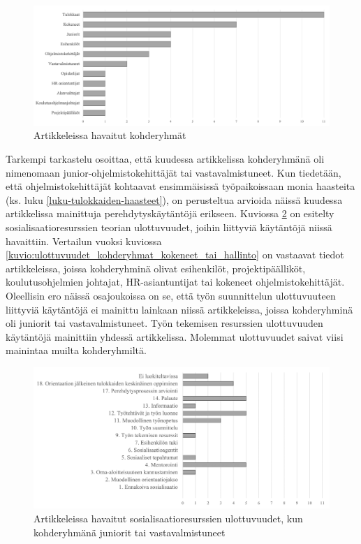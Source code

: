 \documentclass[utf8]{gradu3}
\begin{document}
\begin{figure}[h]
    \centering
    \includegraphics[width=\textwidth]{media/kohderyhmat.png}
    \caption{Artikkeleissa havaitut kohderyhmät}
    \label{kuvio:kohderyhmat}
\end{figure}

Tarkempi tarkastelu osoittaa, että kuudessa artikkelissa kohderyhmänä oli nimenomaan junior-ohjelmistokehittäjät tai vastavalmistuneet. Kun tiedetään, että ohjelmistokehittäjät kohtaavat ensimmäisissä työpaikoissaan monia haasteita (ks. luku \ref{luku-tulokkaiden-haasteet}), on perusteltua arvioida näissä kuudessa artikkelissa mainittuja perehdytyskäytäntöjä erikseen. Kuviossa \ref{kuvio:ulottuvuudet_kohderyhmat_juniorit} on esitelty sosialisaatioresurssien teorian ulottuvuudet, joihin liittyviä käytäntöjä niissä havaittiin. Vertailun vuoksi kuviossa \ref{kuvio:ulottuvuudet_kohderyhmat_kokeneet_tai_hallinto} on vastaavat tiedot artikkeleissa, joissa kohderyhminä olivat esihenkilöt, projektipäälliköt, koulutusohjelmien johtajat, HR-asiantuntijat tai kokeneet ohjelmistokehittäjät. Oleellisin ero näissä osajoukoissa on se, että työn suunnittelun ulottuvuuteen liittyviä käytäntöjä ei mainittu lainkaan niissä artikkeleissa, joissa kohderyhminä oli juniorit tai vastavalmistuneet. Työn tekemisen resurssien ulottuvuuden käytäntöjä mainittiin yhdessä artikkelissa. Molemmat ulottuvuudet saivat viisi mainintaa muilta kohderyhmiltä.

\begin{figure}[h]
    \centering
    \includegraphics[width=\textwidth]{media/ulottuvuudet_kohderyhmat_juniorit-tai_vastavalmistuneet.png}
    \caption{Artikkeleissa havaitut sosialisaatioresurssien ulottuvuudet, kun kohderyhmänä juniorit tai vastavalmistuneet}
    \label{kuvio:ulottuvuudet_kohderyhmat_juniorit}
\end{figure}
\end{document}
